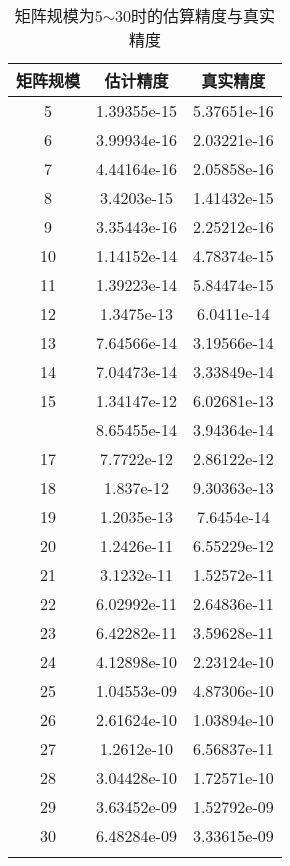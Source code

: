 \documentclass{article}
\begin{document}
\begin{longtable}[c]{ccc}
	\toprule
	\textbf{矩阵规模} & \textbf{估计精度} & \textbf{真实精度} \\
	\endfirsthead
	\endhead
	\midrule
	5             & 1.39355e-15   & 5.37651e-16   \\
	6             & 3.99934e-16   & 2.03221e-16   \\
	7             & 4.44164e-16   & 2.05858e-16   \\
	8             & 3.4203e-15    & 1.41432e-15   \\
	9             & 3.35443e-16   & 2.25212e-16   \\
	10            & 1.14152e-14   & 4.78374e-15   \\
	11            & 1.39223e-14   & 5.84474e-15   \\
	12            & 1.3475e-13    & 6.0411e-14    \\
	13            & 7.64566e-14   & 3.19566e-14   \\
	14            & 7.04473e-14   & 3.33849e-14   \\
	15            & 1.34147e-12   & 6.02681e-13   \\
	\bottomrule
	\newpage
	\toprule
	16            & 8.65455e-14   & 3.94364e-14   \\
	17            & 7.7722e-12    & 2.86122e-12   \\
	18            & 1.837e-12     & 9.30363e-13   \\
	19            & 1.2035e-13    & 7.6454e-14    \\
	20            & 1.2426e-11    & 6.55229e-12   \\
	21            & 3.1232e-11    & 1.52572e-11   \\
	22            & 6.02992e-11   & 2.64836e-11   \\
	23            & 6.42282e-11   & 3.59628e-11   \\
	24            & 4.12898e-10   & 2.23124e-10   \\
	25            & 1.04553e-09   & 4.87306e-10   \\
	26            & 2.61624e-10   & 1.03894e-10   \\
	27            & 1.2612e-10    & 6.56837e-11   \\
	28            & 3.04428e-10   & 1.72571e-10   \\
	29            & 3.63452e-09   & 1.52792e-09   \\
	30            & 6.48284e-09   & 3.33615e-09  \\
	\bottomrule
	\caption{矩阵规模为5$\sim$30时的估算精度与真实精度}
	\label{tab:my-table}\\
\end{longtable}
\end{document}
